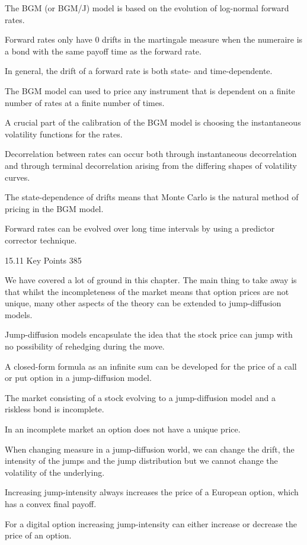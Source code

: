 The BGM (or BGM/J) model is based on the evolution of log-normal forward rates.

Forward rates only have $0$ drifts in the martingale measure when the numeraire is a bond with the same payoff time as the forward rate.

In general, the drift of a forward rate is both state- and time-dependente.

The BGM model can used to price any instrument that is dependent on a finite number of rates at a finite number of times.

A crucial part of the calibration of the BGM model is choosing the instantaneous volatility functions for the rates.

Decorrelation between rates can occur both through instantaneous decorrelation and through terminal decorrelation arising from the differing shapes of volatility curves.

The state-dependence of drifts means that Monte Carlo is the natural method of pricing in the BGM model.

Forward rates can be evolved over long time intervals by using a predictor corrector technique.

15.11 Key Points 385

We have covered a lot of ground in this chapter. The main thing to take away is that whilst the incompleteness of the market means that option prices are not unique, many other aspects of the theory can be extended to jump-diffusion models.

Jump-diffusion models encapsulate the idea that the stock price can jump with no possibility of rehedging during the move.

A closed-form formula as an infinite sum can be developed for the price of a call or put option in a jump-diffusion model.

The market consisting of a stock evolving to a jump-diffusion model and a riskless bond is incomplete.

In an incomplete market an option does not have a unique price.

When changing measure in a jump-diffusion world, we can change the drift, the intensity of the jumps and the jump distribution but we cannot change the volatility of the underlying.

Increasing jump-intensity always increases the price of a European option, which has a convex final payoff.

For a digital option increasing jump-intensity can either increase or decrease the price of an option.

